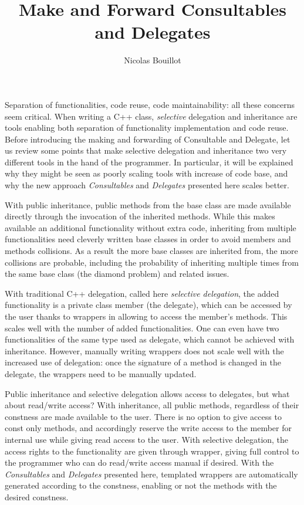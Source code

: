 \documentclass{article}
\begin{document}
\title{Make and Forward Consultables and Delegates}
\author{Nicolas Bouillot}
\maketitle

Separation of functionalities, code reuse, code maintainability: all these concerns seem critical. When writing a C++ class, \textit{selective} delegation and inheritance are tools enabling both separation of functionality implementation and code reuse. Before introducing the making and forwarding of Consultable and Delegate, let us review some points that make selective delegation and inheritance two very different tools in the hand of the programmer. In particular, it will be explained why they might be seen as poorly scaling tools with increase of code base, and why the new approach \textit{Consultables} and \textit{Delegates} presented here scales better.

With public inheritance, public methods from the base class are made available directly through the invocation of the inherited methods. While this makes available an additional functionality without extra code, inheriting from multiple functionalities need cleverly written base classes in order to avoid members and methods collisions. As a result the more base classes are inherited from, the more collisions are probable, including the probability of inheriting multiple times from the same base class (the diamond problem) and related issues.

With traditional C++ delegation, called here \textit{selective delegation}, the added functionality is a private class member (the delegate), which can be accessed by the user thanks to wrappers in allowing to access the member's methods. This scales well with the number of added functionalities. One can even have two functionalities of the same type used as delegate, which cannot be achieved with inheritance. However, manually writing wrappers does not scale well with the increased use of delegation: once the signature of a method is changed in the delegate, the wrappers need to be manually updated.  
 
Public inheritance and selective delegation allows access to delegates, but what about read/write access? With inheritance, all public methods, regardless of their constness are made available to the user. There is no option to give access to const only methods, and accordingly reserve the write access to the member for internal use while giving read access to the user. With selective delegation, the access rights to the functionality are given through wrapper, giving full control to the programmer who can do read/write access manual if desired. With the \textit{Consultables} and \textit{Delegates} presented here, templated wrappers are automatically generated according to the constness, enabling or not the methods with the desired constness. 
\end{document}
